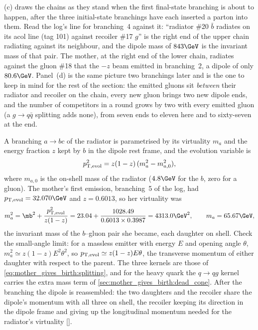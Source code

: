 (c) draws the chains as they stand
when the first final-state branching is about to happen, after the three
initial-state branchings have each inserted a parton into them. Read the
log's line for branching~4 against it: ``radiator \#20 $\bar b$ radiates
on its acol line (tag 101) against recoiler \#17 $g$'' is the right end of
the upper chain radiating against its neighbour, and the dipole mass of
$843\GeV$ is the invariant mass of that pair. The mother, at the right end
of the lower chain, radiates against the gluon \#18 that the $-z$ beam
emitted in branching~2, a dipole of only $80.6\GeV$. Panel~(d) is the same
picture two branchings later and is the one to keep in mind for the rest
of the section: the emitted gluons sit \emph{between} their radiator and
recoiler on the chain, every new gluon brings two new dipole ends, and
the number of competitors in a round grows by two with every emitted gluon
(a $g\to q\bar q$ splitting adds none), from seven ends to eleven here and
to sixty-seven at the end.

A branching $a\to bc$ of the radiator is parametrised by its virtuality
$m_a$ and the energy fraction $z$ kept by $b$ in the dipole rest frame, and
the evolution variable is
\begin{equation}
  p_{\mathrm{T,evol}}^2=z(1-z)\,(m_a^2-m_{a,0}^2),
  \label{eq:mother_gives_birth:pt_evol_fsr}
\end{equation}
where $m_{a,0}$ is the on-shell mass of the radiator ($4.8\GeV$ for the $b$,
zero for a gluon). The mother's first emission, branching~5 of the log,
had $\ptevol=32.070\GeV$ and $z=0.6013$, so her virtuality was
\begin{equation*}
  m_a^2=\mb^2+\frac{\ptevol^2}{z(1-z)}
  =23.04+\frac{1028.49}{0.6013\times0.3987}=4313.0\GeV^2,
  \qquad m_a=65.67\GeV ,
\end{equation*}
the invariant mass of the $b$--gluon pair she became, each daughter on
shell. Check the small-angle limit: for a massless emitter with
energy $E$ and opening angle $\theta$, $m_a^2\simeq z(1-z)E^2\theta^2$, so
$p_{\mathrm{T,evol}}\simeq z(1-z)E\theta$, the transverse momentum of either
daughter with respect to the parent. The three kernels are those of
\cref{eq:mother_gives_birth:splitting}, and for the heavy quark the
$q\to qg$ kernel carries the extra mass term of
\cref{sec:mother_gives_birth:dead_cone}. After the branching the dipole is
reassembled: the two daughters and the recoiler share the dipole's momentum
with all three on shell, the recoiler keeping its direction in the dipole
frame and giving up the longitudinal momentum needed for the radiator's
virtuality [].

